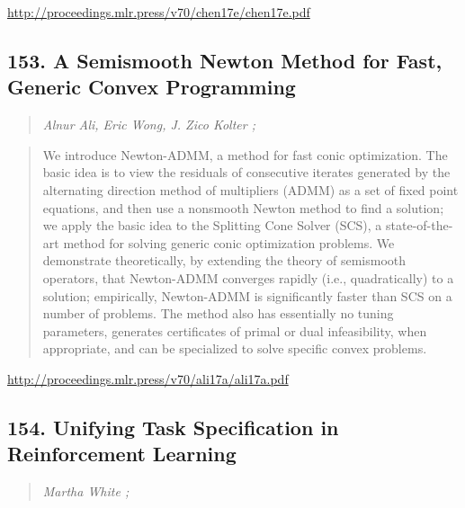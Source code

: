 \documentclass{article}
\begin{document}
\href{http://proceedings.mlr.press/v70/chen17e/chen17e.pdf}{http://proceedings.mlr.press/v70/chen17e/chen17e.pdf}

\subsection{153. A Semismooth Newton Method for Fast, Generic Convex Programming}

\begin{quote}
\footnotesize{\textit{Alnur Ali, Eric Wong, J. Zico Kolter ;}}

\end{quote}

\begin{quote}
    We introduce Newton-ADMM, a method for fast conic optimization. The basic idea is to view the residuals of consecutive iterates generated by the alternating direction method of multipliers (ADMM) as a set of fixed point equations, and then use a nonsmooth Newton method to find a solution; we apply the basic idea to the Splitting Cone Solver (SCS), a state-of-the-art method for solving generic conic optimization problems. We demonstrate theoretically, by extending the theory of semismooth operators, that Newton-ADMM converges rapidly (i.e., quadratically) to a solution; empirically, Newton-ADMM is significantly faster than SCS on a number of problems. The method also has essentially no tuning parameters, generates certificates of primal or dual infeasibility, when appropriate, and can be specialized to solve specific convex problems.  
\end{quote}

\href{http://proceedings.mlr.press/v70/ali17a/ali17a.pdf}{http://proceedings.mlr.press/v70/ali17a/ali17a.pdf}

\subsection{154. Unifying Task Specification in Reinforcement Learning}

\begin{quote}
\footnotesize{\textit{Martha White ;}}

\end{quote}
\end{document}
